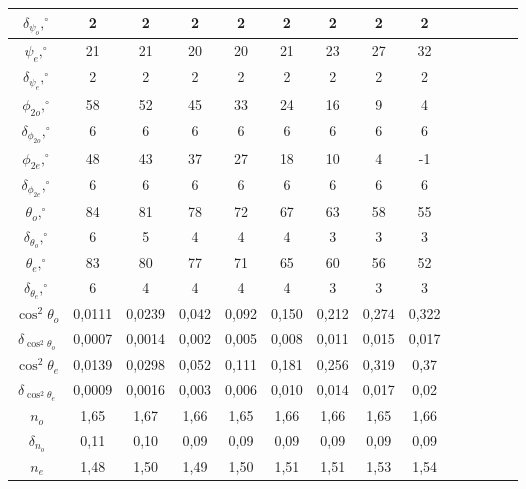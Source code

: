\documentclass[a4paper, 12pt]{article}%
\begin{document}
\begin{enumerate}
\begin{center}
\begin{tabular}{|c|c|c|c|c|c|c|c|c|c|c|c|c|c|}
$\delta_{\psi_o},  ^{\circ}$   & 2      & 2      & 2     & 2     & 2     & 2     & 2     & 2     \\ \hline
$\psi_e, ^{\circ}$             & 21     & 21     & 20    & 20    & 21    & 23    & 27    & 32    \\ \hline
$\delta_{\psi_e}, ^{\circ}$    & 2      & 2      & 2     & 2     & 2     & 2     & 2     & 2      \\ \hline
$\phi_{2o},  ^{\circ}$         & 58     & 52     & 45    & 33    & 24    & 16    & 9     & 4     \\ \hline
$\delta_{\phi_{2o}}, ^{\circ}$ & 6      & 6      & 6     & 6     & 6     & 6     & 6     & 6     \\ \hline
$\phi_{2e}, ^{\circ}$          & 48     & 43     & 37    & 27     & 18    & 10     & 4     & -1    \\ \hline
$\delta_{\phi_{2e}}, ^{\circ}$ & 6      & 6      & 6     & 6     & 6     & 6     & 6     & 6     \\ \hline
$\theta_o, ^{\circ}$           & 84     & 81     & 78    & 72    & 67    & 63    & 58    & 55    \\ \hline
$\delta_{\theta_o}, ^{\circ}$  & 6      & 5      & 4     & 4     & 4      & 3     & 3     & 3     \\ \hline
$\theta_e, ^{\circ}$           & 83     & 80     & 77    & 71    & 65    & 60    & 56     & 52    \\ \hline
$\delta_{\theta_e}, ^{\circ}$  & 6      & 4      & 4     & 4     & 4     & 3     & 3     & 3     \\ \hline
$\cos^2\theta_o$               & 0,0111 & 0,0239 & 0,042 & 0,092 & 0,150 & 0,212 & 0,274 & 0,322 \\ \hline
$\delta_{\cos^2\theta_o}$      & 0,0007 & 0,0014 & 0,002 & 0,005 & 0,008 & 0,011 & 0,015 & 0,017 \\ \hline
$\cos^2\theta_e$               & 0,0139 & 0,0298 & 0,052 & 0,111 & 0,181 & 0,256 & 0,319 & 0,37  \\ \hline
$\delta_{\cos^2\theta_e}$      & 0,0009 & 0,0016 & 0,003 & 0,006 & 0,010 & 0,014 & 0,017 & 0,02  \\ \hline
$n_o$                          & 1,65   & 1,67   & 1,66  & 1,65  & 1,66  & 1,66  & 1,65  & 1,66  \\ \hline
$\delta_{n_o}$                 & 0,11   & 0,10   & 0,09  & 0,09  & 0,09  & 0,09  & 0,09  & 0,09  \\ \hline
$n_e$                          & 1,48   & 1,50   & 1,49  & 1,50  & 1,51  & 1,51  & 1,53  & 1,54  \\ \hline

\end{tabular}
\end{center}
\end{enumerate}
\end{document}
